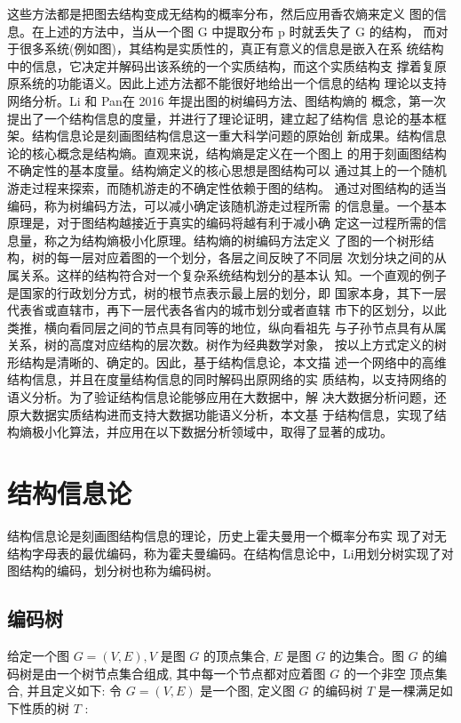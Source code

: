 \documentclass[a4paper]{apa6}
\begin{document}
这些方法都是把图去结构变成无结构的概率分布，然后应用香农熵来定义 图的信息。在上述的方法中，当从一个图 G 中提取分布 p 时就丢失了 G 的结构， 而对于很多系统(例如图)，其结构是实质性的，真正有意义的信息是嵌入在系 统结构中的信息，它决定并解码出该系统的一个实质结构，而这个实质结构支 撑着复原原系统的功能语义。因此上述方法都不能很好地给出一个信息的结构 理论以支持网络分析。Li 和 Pan\citep{li_structural_2016}在 2016 年提出图的树编码方法、图结构熵的 概念，第一次提出了一个结构信息的度量，并进行了理论证明，建立起了结构信 息论的基本框架。结构信息论\citep{li_structural_2016}是刻画图结构信息这一重大科学问题的原始创 新成果。结构信息论的核心概念是结构熵。直观来说，结构熵是定义在一个图上 的用于刻画图结构不确定性的基本度量。结构熵定义的核心思想是图结构可以 通过其上的一个随机游走过程来探索，而随机游走的不确定性依赖于图的结构。 通过对图结构的适当编码，称为树编码方法，可以减小确定该随机游走过程所需 的信息量。一个基本原理是，对于图结构越接近于真实的编码将越有利于减小确 定这一过程所需的信息量，称之为结构熵极小化原理。结构熵的树编码方法定义 了图的一个树形结构，树的每一层对应着图的一个划分，各层之间反映了不同层 次划分块之间的从属关系。这样的结构符合对一个复杂系统结构划分的基本认 知。一个直观的例子是国家的行政划分方式，树的根节点表示最上层的划分，即 国家本身，其下一层代表省或直辖市，再下一层代表各省内的城市划分或者直辖 市下的区划分，以此类推，横向看同层之间的节点具有同等的地位，纵向看祖先 与子孙节点具有从属关系，树的高度对应结构的层次数。树作为经典数学对象， 按以上方式定义的树形结构是清晰的、确定的。因此，基于结构信息论，本文描 述一个网络中的高维结构信息，并且在度量结构信息的同时解码出原网络的实 质结构，以支持网络的语义分析。为了验证结构信息论能够应用在大数据中，解 决大数据分析问题，还原大数据实质结构进而支持大数据功能语义分析，本文基 于结构信息，实现了结构熵极小化算法，并应用在以下数据分析领域中，取得了显著的成功。

\section{结构信息论}
\label{sec:org716b891}
结构信息论\citep{li_structural_2016}是刻画图结构信息的理论，历史上霍夫曼用一个概率分布实 现了对无结构字母表的最优编码，称为霍夫曼编码。在结构信息论中，Li\citep{li_structural_2016}用划分树实现了对图结构的编码，划分树也称为编码树。

\subsection{编码树}
\label{sec:org7de0248}
给定一个图 \(G=(V, E), V\) 是图 \(G\) 的顶点集合, \(E\) 是图 \(G\) 的边集合。图 \(G\) 的编码树是由一个树节点集合组成, 其中每一个节点都对应着图 \(G\) 的一个非空 顶点集合, 并且定义如下:
令 \(G=(V, E)\) 是一个图, 定义图 \(G\) 的编码树 \(T\) 是一棵满足如下性质的树 \(T\) :
\end{document}
